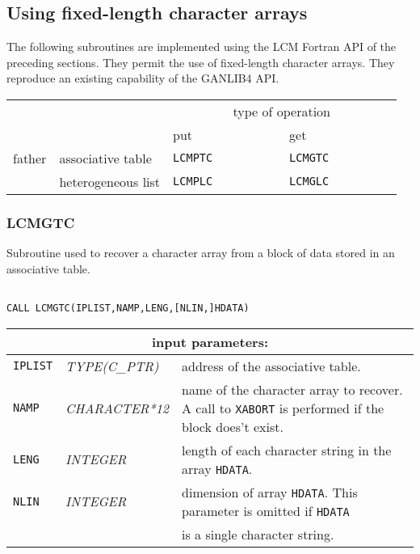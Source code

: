 \vskip 0.8cm

\subsection{Using fixed-length character arrays}

The following subroutines are implemented using the LCM Fortran API of the preceding sections. They
permit the use of fixed-length character arrays. They reproduce an existing capability of the GANLIB4 API.

\vskip 0.4cm

\begin{center}
\begin{tabular}{|c|l|l|l|}
\cline{3-4}
\multicolumn{2}{c|}{} & \multicolumn{2}{c|}{type of operation} \\
\cline{3-4}
\multicolumn{2}{c|}{} & put~~~~~~~~~~~~~ & get~~~~~~~~~~~~~ \\
\hline
father & associative table & {\tt LCMPTC} & {\tt LCMGTC} \\
\cline{2-4}
       & heterogeneous list & {\tt LCMPLC} & {\tt LCMGLC} \\
\hline
\end{tabular}
\end{center}

\subsubsection{LCMGTC}\label{sect:LCMGTC}

Subroutine used to recover a character array from a block of data stored in an associative table.

\begin{verbatim}

CALL LCMGTC(IPLIST,NAMP,LENG,[NLIN,]HDATA)
\end{verbatim}

\noindent
\begin{tabular}{|p{1.5cm}|p{3cm}|p{10cm}|}
\hline
\multicolumn{3}{|c|}{\bf input parameters:} \\
\hline
{\tt IPLIST} & {\it TYPE(C\_PTR)} & address of the associative table. \\
\hline
{\tt NAMP} & {\it CHARACTER*12} &  name of the character array
to recover. A call to {\tt XABORT} is performed if the block does't exist. \\
\hline
{\tt LENG} & {\it INTEGER} & length of each character string in the array {\tt HDATA}. \\
\hline
{\tt NLIN} & {\it INTEGER} & dimension of array {\tt HDATA}. This parameter is omitted if {\tt HDATA} \\
& & is a single character string. \\
\hline
\end{tabular}

